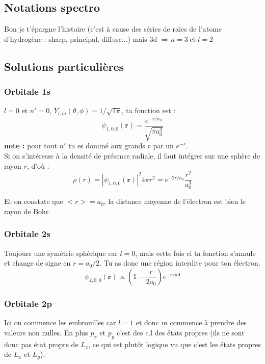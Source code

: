 \documentclass[a4paper]{report}
\begin{document}
\subsection{Notations spectro}
Bon je t'épargne l'histoire (c'est à cause des séries de raies de l'atome d'hydrogène : sharp, principal, diffuse...) mais 3d $\Rightarrow n=3\; \mathrm{et} \;l=2$
\subsection{Solutions particulières}
\subsubsection{Orbitale 1s}
$l=0$ et $n'=0$, $Y_{l,m}(\theta, \phi)=1/\sqrt{4\pi}$, ta fonction est : \begin{equation}
\psi_{1,0,0}(\bm r) = \dfrac{e^{-r/a_0}}{\sqrt{\pi a_0^3}}
\end{equation}
\textbf{note :} pour tout $n'$ tu es dominé aux grands $r$ par un $e^{-r}$. \\

Si on s'intéresse à la densité de présence radiale, il faut intégrer sur une sphère de rayon $r$, d'où :
\begin{equation}
\rho(r)=|\psi_{1,0,0}(\bm r)|^2 4 \pi r^2= e^{-2r/a_0} \dfrac{r^2}{a_0^3}
\end{equation}

Et on constate que $<r> = a_0$, la distance moyenne de l'électron est bien le rayon de Bohr

\subsubsection{Orbitale 2s}
Toujours une symétrie sphérique car $l=0$, mais cette fois ci ta fonction s'annule et change de signe en $r=a_0/2$. Tu as donc une région interdite pour ton électron. \begin{equation}
\psi_{2,0,0}(\bm r) \propto \left(1-\dfrac{r}{2 a_0}\right) e^{-r/a0}
\end{equation}

\subsubsection{Orbitale 2p}
Ici on commence les embrouilles car $l=1$ et donc $m$ commence à prendre des valeurs non nulles. En plus $p_x$ et $p_y$ c'est des c.l des états propres (ils ne sont donc pas état propre de $L_z$, ce qui est plutôt logique vu que c'est les états propres de $L_x$ et $L_y$).
\end{document}

